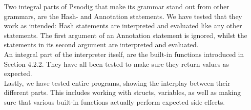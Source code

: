 Two integral parts of Psnodig that make its grammar stand out from other grammars, are the Hash- and Annotation statements. We have tested that they work as intended: Hash statements are interpreted and evaluated like any other statements. The first argument of an Annotation statement is ignored, whilst the statements in its second argument are interpreted and evaluated. \\

An integral part of the interpreter itself, are the built-in functions introduced in Section 4.2.2. They have all been tested to make sure they return values as expected. \\

Lastly, we have tested entire programs, showing the interplay between their different parts. This includes working with structs, variables, as well as making sure that various built-in functions actually perform expected side effects.